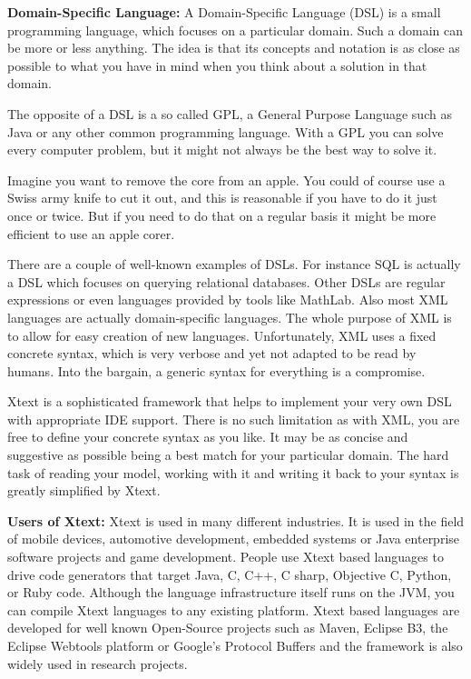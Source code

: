 \begin{itemize}
	\textbf{Domain-Specific Language:}
	A Domain-Specific Language (DSL) is a small programming language, which focuses on a particular domain. Such a domain can be more or less anything. The idea is that its concepts and notation is as close as possible to what you have in mind when you think about a solution in that domain. 
		
	The opposite of a DSL is a so called GPL, a General Purpose Language such as Java or any other common programming language. With a GPL you can solve every computer problem, but it might not always be the best way to solve it.
	
	Imagine you want to remove the core from an apple. You could of course use a Swiss army knife to cut it out, and this is reasonable if you have to do it just once or twice. But if you need to do that on a regular basis it might be more efficient to use an apple corer.
	
	There are a couple of well-known examples of DSLs. For instance SQL is actually a DSL which focuses on querying relational databases. Other DSLs are regular expressions or even languages provided by tools like MathLab. Also most XML languages are actually domain-specific languages. The whole purpose of XML is to allow for easy creation of new languages. Unfortunately, XML uses a fixed concrete syntax, which is very verbose and yet not adapted to be read by humans. Into the bargain, a generic syntax for everything is a compromise.
	
	Xtext is a sophisticated framework that helps to implement your very own DSL with appropriate IDE support. There is no such limitation as with XML, you are free to define your concrete syntax as you like. It may be as concise and suggestive as possible being a best match for your particular domain. The hard task of reading your model, working with it and writing it back to your syntax is greatly simplified by Xtext.
	
	\textbf{Users of Xtext:}
	Xtext is used in many different industries. It is used in the field of mobile devices, automotive development, embedded systems or Java enterprise software projects and game development. People use Xtext based languages to drive code generators that target Java, C, C++, C sharp, Objective C, Python, or Ruby code. Although the language infrastructure itself runs on the JVM, you can compile Xtext languages to any existing platform. Xtext based languages are developed for well known Open-Source projects such as Maven, Eclipse B3, the Eclipse Webtools platform or Google's Protocol Buffers and the framework is also widely used in research projects.
	

\end{itemize}
